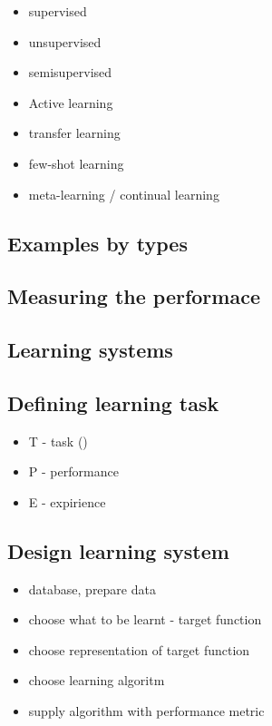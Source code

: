 \documentclass[12pt, letterpaper, twoside]{article}
\begin{document}
\begin{itemize}
    \item supervised
    \item unsupervised
    \item semisupervised
    \item Active learning
    \item transfer learning
    \item few-shot learning
    \item meta-learning / continual learning
\end{itemize}

\subsection*{}

\subsection*{Examples by types}

\subsection*{Measuring the performace}

\subsection*{Learning systems}

\subsection*{Defining learning task}

\begin{itemize}
    \item T - task ()
    \item P - performance
    \item E - expirience
\end{itemize}

\subsection*{Design learning system}

\begin{itemize}
    \item database, prepare data
    \item choose what to be learnt - target function
    \item choose representation of target function
    \item choose learning algoritm
    \item supply algorithm with performance metric
\end{itemize}
\end{document}

